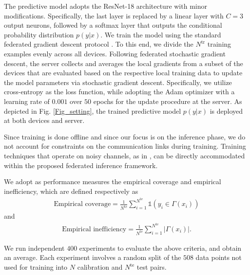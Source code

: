 \documentclass[12pt, draftclsnofoot, onecolumn]{IEEEtran}
\begin{document}
The predictive model adopts the ResNet-18 architecture \cite{he2016deep} with minor modifications. Specifically, the last layer is replaced by a linear layer with $C=3$ output neurons, followed by a softmax layer that outputs the conditional probability distribution $p(y|x)$. We train the model using the standard federated gradient descent protocol \cite{mcmahan2017communication}. To this end, we divide the $N^{\text{tr}}$ training examples evenly across all devices. Following federated stochastic gradient descent, the server collects and averages the local gradients from a subset of the devices that are evaluated based on the respective local training data to update the model parameters via stochastic gradient descent. Specifically, we utilize cross-entropy as the loss function, while adopting the Adam optimizer with a learning rate of $0.001$ over $50$ epochs for the update procedure at the server. As depicted in Fig. \ref{Fig_setting}, the trained predictive model $p(y|x)$ is deployed at both devices and server.

Since training is done offline and since our focus is on the inference phase, we do not account for constraints on the communication links during training. Training techniques that operate on noisy channels, as in \cite{liu2020privacy, zhu2019broadband, amiri2020machine, yang2020federated}, can be directly accommodated within the proposed federated inference framework.

We adopt as performance measures the empirical coverage and empirical inefficiency, which are defined respectively as
\begin{align}\label{emp_cov}
    \text{Empirical coverage} = \frac{1}{N^{\text{te}}}\sum_{i=1}^{N^{\text{te}}}\mathds{1}\left(y_i \in \Gamma(x_i)\right)
\end{align}
and
\begin{align}\label{emp_inef}
    \text{Empirical inefficiency}= \frac{1}{N^{\text{te}}}\sum_{i=1}^{N^{\text{te}}}\left|\Gamma(x_i)\right|.
\end{align}

We run independent $400$ experiments to evaluate the above criteria, and obtain an average. Each experiment involves a random split of the $508$ data points not used for training into $N$ calibration and $N^\text{te}$ test pairs.
\end{document}
